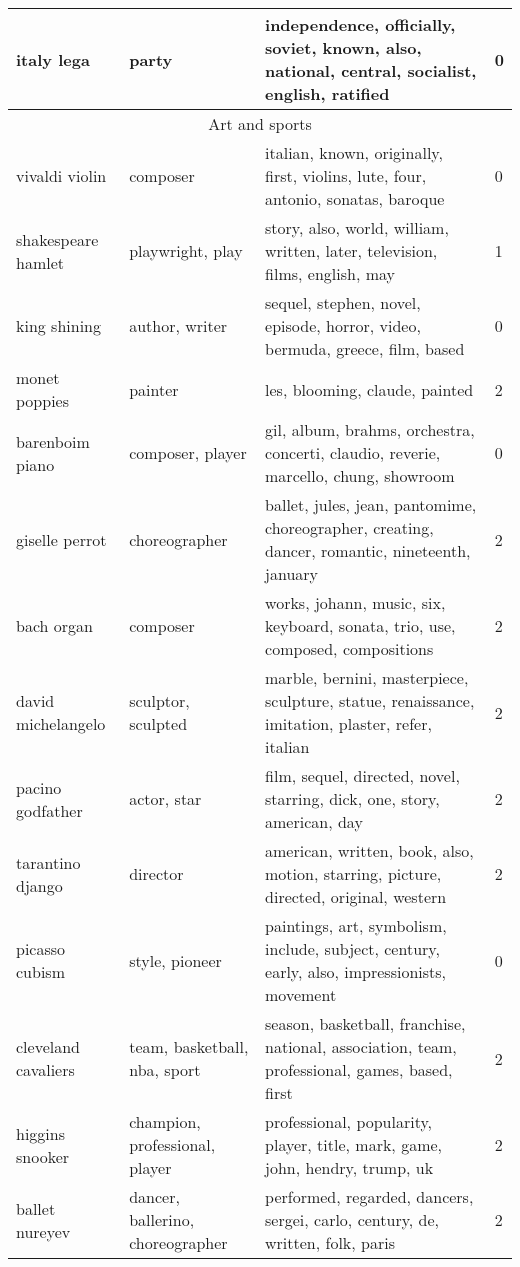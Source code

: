 \documentclass[11pt,a4paper]{article}
\begin{document}
\begin{longtable}[c]{|l|l|p{5cm}|l|}
italy lega  & party & independence, officially, soviet, known, also, national, central, socialist, english, ratified & 0 \\ \hline \hline 
\multicolumn{4}{|c|}{Art and sports} \\ \hline 
vivaldi violin  & composer & italian, known, originally, first, violins, lute, four, antonio, sonatas, baroque & 0 \\ \hline 
shakespeare hamlet  & playwright, play & story, also, world, william, written, later, television, films, english, may & 1 \\ \hline 
king shining  & author, writer & sequel, stephen, novel, episode, horror, video, bermuda, greece, film, based & 0 \\ \hline 
monet poppies  & painter & les, blooming, claude, painted & 2 \\ \hline 
barenboim piano  & composer, player & gil, album, brahms, orchestra, concerti, claudio, reverie, marcello, chung, showroom & 0 \\ \hline 
giselle perrot  & choreographer & ballet, jules, jean, pantomime, choreographer, creating, dancer, romantic, nineteenth, january & 2 \\ \hline 
bach organ  & composer & works, johann, music, six, keyboard, sonata, trio, use, composed, compositions & 2 \\ \hline 
david michelangelo  & sculptor, sculpted & marble, bernini, masterpiece, sculpture, statue, renaissance, imitation, plaster, refer, italian & 2 \\ \hline 
pacino godfather  & actor, star & film, sequel, directed, novel, starring, dick, one, story, american, day & 2 \\ \hline 
tarantino django  & director & american, written, book, also, motion, starring, picture, directed, original, western & 2 \\ \hline 
picasso cubism  & style, pioneer & paintings, art, symbolism, include, subject, century, early, also, impressionists, movement & 0 \\ \hline 
cleveland cavaliers  & team, basketball, nba, sport & season, basketball, franchise, national, association, team, professional, games, based, first & 2 \\ \hline 
higgins snooker  & champion, professional, player & professional, popularity, player, title, mark, game, john, hendry, trump, uk & 2 \\ \hline 
ballet nureyev  & dancer, ballerino, choreographer & performed, regarded, dancers, sergei, carlo, century, de, written, folk, paris & 2 \\ \hline 

\end{longtable}
\end{document}
